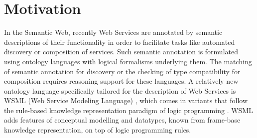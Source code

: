 \section{Motivation\label{sec:motivation}}
%
In the Semantic Web, recently Web Services are annotated by
semantic descriptions of their functionality in order to
facilitate tasks like automated discovery or composition of
services. Such semantic annotation is formulated using ontology
languages with logical formalisms underlying them. The matching of
semantic annotation for discovery or the checking of type
compatibility for composition requires reasoning support for these
languages. A relatively new ontology language specifically
tailored for the description of Web Services is WSML (Web Service
Modeling Language) \cite{wsml}, which comes in variants that
follow the rule-based knowledge representation paradigm of logic
programming \cite{lloyd-FoundationsOfLP}. WSML adds features of
conceptual modelling and datatypes, known from frame-base
knowledge representation, on top of logic programming rules.

